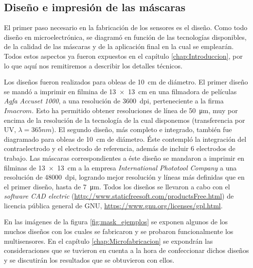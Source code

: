 	\subsection{Diseño e impresión de las máscaras}\label{sec:impresion_mascaras}

		El primer paso necesario en la fabricación de los sensores es el diseño. Como todo diseño en microelectrónica, se diagramó en función de las tecnologías disponibles, de la calidad de las máscaras y de la aplicación final en la cual se emplearán. Todos estos aspectos ya fueron expuestos en el capítulo \ref{chap:Introduccion}, por lo que aquí nos remitiremos a describir los detalles técnicos.

		Los diseños fueron realizados para obleas de \SI{10}{\cm} de diámetro. El primer diseño se mandó a imprimir en filmina de \SI{13x13}{\cm} en una filmadora de películas \textit{Agfa Accuset 1000}, a una resolución de \SI{3600}{dpi}, perteneciente a la firma $Imacrom$. Esto ha permitido obtener resoluciones de línea de \SI{50}{\um}, muy por encima de la resolución de la tecnología de la cual disponemos (transferencia por UV, $\lambda=365nm$). El segundo diseño, más completo e integrado, también fue diagramado para obleas de \SI{10}{\cm} de diámetro. Éste contempló la integración del contraelectrodo y el electrodo de referencia, además de incluir 6 electrodos de trabajo. Las máscaras correspondientes a éste diseño se mandaron a imprimir en filminas de \SI{13x13}{\cm} a la empresa \textit{International Phototool Company} a una resolución de \SI{48000}{dpi}, logrando mejor resolución y líneas más definidas que en el primer diseño, hasta de \SI{7}{\um}. Todos los diseños se llevaron a cabo con el \textit{software CAD electric} (\url{http://www.staticfreesoft.com/productsFree.html}) de licencia pública general de GNU, \url{https://www.gnu.org/licenses/gpl.html}.

		En las imágenes de la figura \ref{fig:mask_ejemplos} se exponen algunos de los muchos diseños con los cuales se fabricaron y se probaron funcionalmente los multisensores. En el capítulo \ref{chap:Microfabricacion} se expondrán las consideraciones que se tuvieron en cuenta a la hora de confeccionar dichos diseños y se discutirán los resultados que se obtuvieron con ellos.

